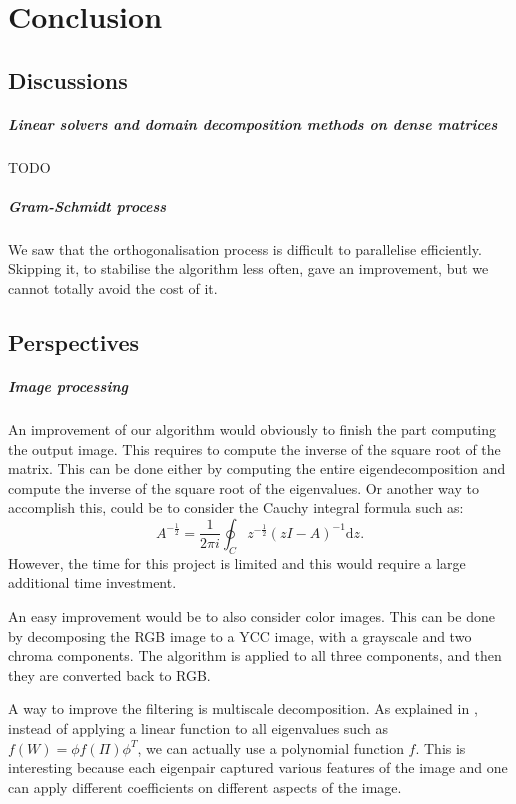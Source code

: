 \chapter{Conclusion}

\section{Discussions}

\paragraph{Linear solvers and domain decomposition methods on dense matrices}
TODO

\paragraph{Gram-Schmidt process}
We saw that the orthogonalisation process is difficult to parallelise efficiently.
Skipping it, to stabilise the algorithm less often, gave an improvement, but we cannot totally avoid the cost of it.

\section{Perspectives}

\paragraph{Image processing}
An improvement of our algorithm would obviously to finish the part computing the output image.
This requires to compute the inverse of the square root of the matrix.
This can be done either by computing the entire eigendecomposition and compute the inverse of the square root of the eigenvalues.
Or another way to accomplish this, could be to consider the Cauchy integral formula such as:
\[A^{-\frac{1}{2}} = \frac{1}{2\pi i} \oint_C z^{-\frac{1}{2}} (zI - A)^{-1} \mathrm{d}z.\]
However, the time for this project is limited and this would require a large additional time investment.

An easy improvement would be to also consider color images.
This can be done by decomposing the RGB image to a YCC image, with a grayscale and two chroma components.
The algorithm is applied to all three components, and then they are converted back to RGB.

A way to improve the filtering is multiscale decomposition.
As explained in \cite{talebi_nonlocal_2014}, instead of applying a linear function to all eigenvalues such as \(f(W) = \phi f(\Pi) \phi^T\), we can actually use a polynomial function \(f\).
This is interesting because each eigenpair captured various features of the image and one can apply different coefficients on different aspects of the image.


